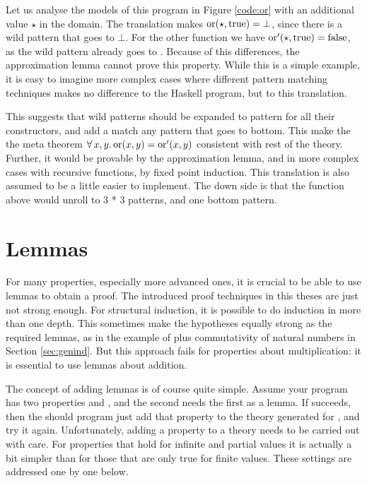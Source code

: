 Let us analyse the models of this program in Figure \ref{code:or} with
an additional value $\star$ in the domain. The translation makes
$\mathrm{or}(\star,\mathrm{true}) = \bot$, since there is a wild pattern that
goes to $\bot$. For the other function we have
$\mathrm{or'}(\star,\mathrm{true}) = \mathrm{false}$, as the wild pattern already
goes to . Because of this differences, the approximation
lemma cannot prove this property. While this is a simple example, it
is easy to imagine more complex cases where different pattern matching
techniques makes no difference to the Haskell program, but to this
translation.

This suggests that wild patterns should be expanded to pattern for all
their constructors, and add a match any pattern that goes to
bottom. This make the the meta theorem
$\forall \, x , y . \, \mathrm{or}(x,y) = \mathrm{or'}(x,y)$ consistent with rest of the
theory.  Further, it would be provable by the approximation lemma, and
in more complex cases with recursive functions, by fixed point
induction. This translation is also assumed to be a little easier to
implement. The down side is that the  function above would
unroll to 3 * 3 patterns, and one bottom pattern.

\section{Lemmas}

For many properties, especially more advanced ones, it is crucial to
be able to use lemmas to obtain a proof. The introduced proof
techniques in this theses are just not strong enough. For structural
induction, it is possible to do induction in more than one depth. This
sometimes make the hypotheses equally strong as the required lemmas,
as in the example of plus commutativity of natural numbers in Section
\ref{sec:genind}. But this approach fails for properties about
multiplication: it is essential to use lemmas about addition.

The concept of adding lemmas is of course quite simple. Assume your
program has two properties  and , and the
second needs the first as a lemma. If  succeeds, then the
should program just add that property to the theory generated for
, and try it again. Unfortunately, adding a property to a
theory needs to be carried out with care. For properties that hold for
infinite and partial values it is actually a bit simpler than for
those that are only true for finite values. These settings are
addressed one by one below.

